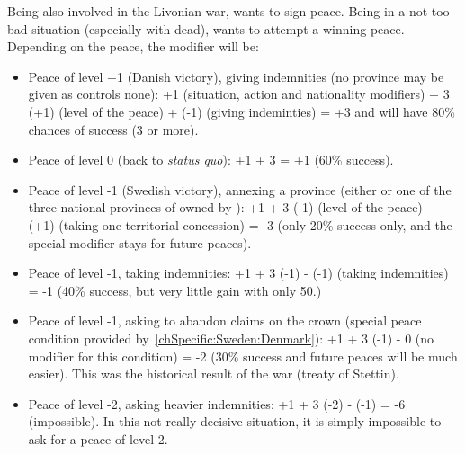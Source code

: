 \begin{exemple}
  Being also involved in the Livonian war, \SUE wants to sign peace. Being in
  a not too bad situation (especially with \leaderRantzau dead), \SUE wants to
  attempt a winning peace. Depending on the peace, the modifier will be:
  \begin{itemize}
  \item Peace of level +1 (Danish victory), giving indemnities (no province
    may be given as \paysDanemark controls none): +1 (situation, action and
    nationality modifiers) + 3 \textmultiply (+1) (level of the peace) + (-1)
    (giving indeminties) = +3 and will have 80\% chances of success (3 or
    more).
  \item Peace of level 0 (back to \emph{status quo}): +1 + 3 
    = +1 (60\% success).
  \item Peace of level -1 (Swedish victory), annexing a province (either
    \provinceTrondelag or one of the three national provinces of \SUE owned by
    \paysDanemark): +1 + 3 \textmultiply (-1) (level of the peace) - (+1)
    (taking one territorial concession) = -3 (only 20\% success only, and the
    special modifier stays for future peaces).
  \item Peace of level -1, taking indemnities: +1 + 3 \textmultiply (-1) -
    (-1) (taking indemnities) = -1 (40\% success, but very little gain with
    only 50\ducats.)
  \item Peace of level -1, asking \paysDanemark to abandon claims on the crown
    (special peace condition provided by~\ref{chSpecific:Sweden:Denmark}): +1
    + 3 \textmultiply (-1) - 0 (no modifier for this condition) = -2 (30\%
    success and future peaces will be much easier). This was the historical
    result of the war (treaty of Stettin).
  \item Peace of level -2, asking heavier indemnities: +1 + 3 \textmultiply
    (-2) - (-1) = -6 (impossible). In this not really decisive situation, it
    is simply impossible to ask for a peace of level 2.
  \end{itemize}
\end{exemple}

